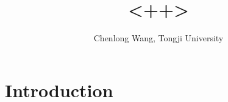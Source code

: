\documentclass[notimes]{segabs}
\begin{document}

\title{<++>}
\author{Chenlong Wang, Tongji University}

\maketitle
\section{Introduction}
\end{document}
